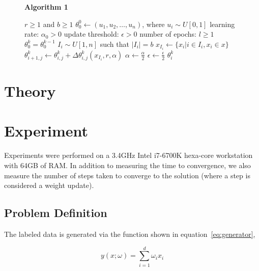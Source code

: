\documentclass[,conference,compsoc]{IEEEtran}
\begin{document}
\begin{figure}
    \textbf{Algorithm 1}
    \label{fig:algorithm1}
    \begin{algorithmic}[1]
    \REQUIRE $r \geq 1$ and $b \geq 1$ 
    \REQUIRE $\theta_0^0 \gets (u_1, u_2, \dots, u_n)$, where $u_i \sim U[0, 1]$
    \REQUIRE learning rate: $\alpha_0 > 0$
    \REQUIRE update threshold: $\epsilon > 0$
    \REQUIRE number of epochs: $l \geq 1$ 
    \STATE $\theta_0^k = \theta_0^{k-1}$
            \STATE $I_i \sim U[1, n]$ such that  $|I_i| = b$
            \STATE $x_{I_i} \gets \{x_i | i \in I_i, x_i\in x\}$
                \STATE $\theta_{i+1,j}^k \gets \theta_{i,j}^k + \Delta \theta_{i,j}^k(x_{I_i}, r,
                    \alpha)$
                    \STATE $\alpha \gets \frac{\alpha}{2}$
                    \STATE $\epsilon \gets \frac{\epsilon}{2}$
                    \RETURN $\theta_i^k$
                \ENDIF
            \ENDFOR
        \ENDFOR
    \ENDFOR 
    \end{algorithmic}
\end{figure}

\section{Theory}

\section{Experiment}
Experiments were performed on a 3.4GHz Intel i7-6700K hexa-core workstation with 64GB
of RAM. In addition to measuring the time to convergence, we also measure the
number of steps taken to converge to the solution (where a step is considered a
weight update).

\subsection{Problem Definition}
The labeled data is generated via the function shown in
equation~\ref{eq:generator},

\begin{equation}\label{eq:generator}
    y(x;\omega) = \sum_{i=1}^d \omega_i x_i
\end{equation}
\end{document}
